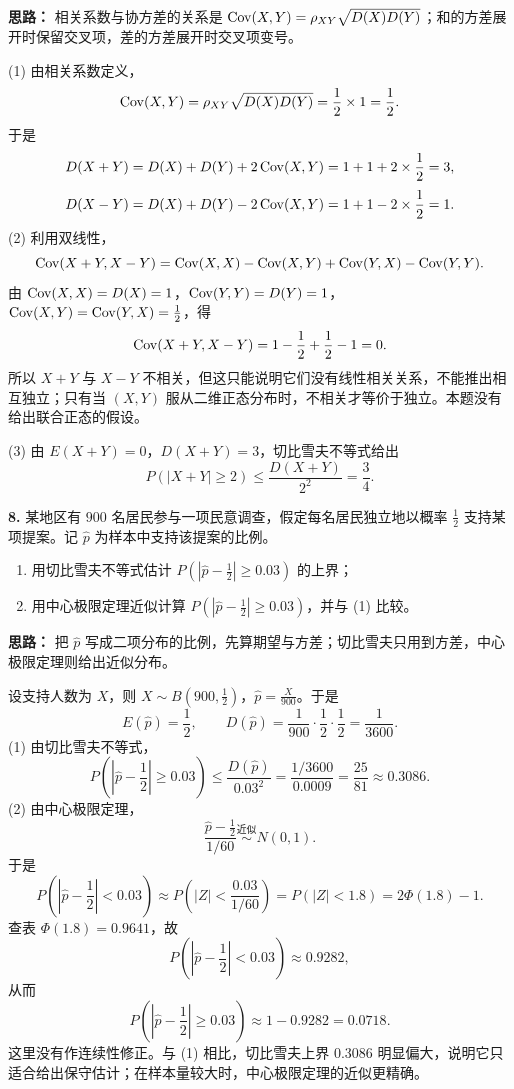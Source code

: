 \ifshowsolutions%
\textbf{思路：} 相关系数与协方差的关系是 $\operatorname{Cov}(X,Y)=\rho_{XY}\sqrt{D(X)D(Y)}$；和的方差展开时保留交叉项，差的方差展开时交叉项变号。

(1) 由相关系数定义，
\[
\operatorname{Cov}(X,Y)=\rho_{XY}\sqrt{D(X)D(Y)}
=\frac12\times1=\frac12.
\]
于是
\[
D(X+Y)=D(X)+D(Y)+2\operatorname{Cov}(X,Y)=1+1+2\times\frac12=3,
\]
\[
D(X-Y)=D(X)+D(Y)-2\operatorname{Cov}(X,Y)=1+1-2\times\frac12=1.
\]
(2) 利用双线性，
\[
\operatorname{Cov}(X+Y,X-Y)=\operatorname{Cov}(X,X)-\operatorname{Cov}(X,Y)+\operatorname{Cov}(Y,X)-\operatorname{Cov}(Y,Y).
\]
由 $\operatorname{Cov}(X,X)=D(X)=1$，$\operatorname{Cov}(Y,Y)=D(Y)=1$，$\operatorname{Cov}(X,Y)=\operatorname{Cov}(Y,X)=\frac12$，得
\[
\operatorname{Cov}(X+Y,X-Y)=1-\frac12+\frac12-1=0.
\]
所以 $X+Y$ 与 $X-Y$ 不相关，但这只能说明它们没有线性相关关系，不能推出相互独立；只有当 $(X,Y)$ 服从二维正态分布时，不相关才等价于独立。本题没有给出联合正态的假设。

(3) 由 $E(X+Y)=0$，$D(X+Y)=3$，切比雪夫不等式给出
\[
P(|X+Y|\geq2)\leq\frac{D(X+Y)}{2^2}=\frac34.
\]

\else \answerarea[8] \fi%

\textbf{8.} 某地区有 $900$ 名居民参与一项民意调查，假定每名居民独立地以概率 $\frac12$ 支持某项提案。记 $\hat p$ 为样本中支持该提案的比例。
\begin{enumerate}
    \item[(1)] 用切比雪夫不等式估计 $P(|\hat p-\frac12|\geq0.03)$ 的上界；
    \item[(2)] 用中心极限定理近似计算 $P(|\hat p-\frac12|\geq0.03)$，并与 (1) 比较。
\end{enumerate}

\ifshowsolutions%
\textbf{思路：} 把 $\hat p$ 写成二项分布的比例，先算期望与方差；切比雪夫只用到方差，中心极限定理则给出近似分布。

设支持人数为 $X$，则 $X\sim B(900,\frac12)$，$\hat p=\frac{X}{900}$。于是
\[
E(\hat p)=\frac12,\qquad
D(\hat p)=\frac{1}{900}\cdot\frac12\cdot\frac12=\frac1{3600}.
\]
(1) 由切比雪夫不等式，
\[
P\left(\left|\hat p-\frac12\right|\geq0.03\right)
\leq\frac{D(\hat p)}{0.03^2}
=\frac{1/3600}{0.0009}
=\frac{25}{81}\approx0.3086.
\]
(2) 由中心极限定理，
\[
\frac{\hat p-\frac12}{1/60}\overset{\text{近似}}{\sim}N(0,1).
\]
于是
\[
P\left(\left|\hat p-\frac12\right|<0.03\right)
\approx P\left(|Z|<\frac{0.03}{1/60}\right)
=P(|Z|<1.8)
=2\Phi(1.8)-1.
\]
查表 $\Phi(1.8)=0.9641$，故
\[
P\left(\left|\hat p-\frac12\right|<0.03\right)\approx0.9282,
\]
从而
\[
P\left(\left|\hat p-\frac12\right|\geq0.03\right)\approx1-0.9282=0.0718.
\]
这里没有作连续性修正。与 (1) 相比，切比雪夫上界 $0.3086$ 明显偏大，说明它只适合给出保守估计；在样本量较大时，中心极限定理的近似更精确。


